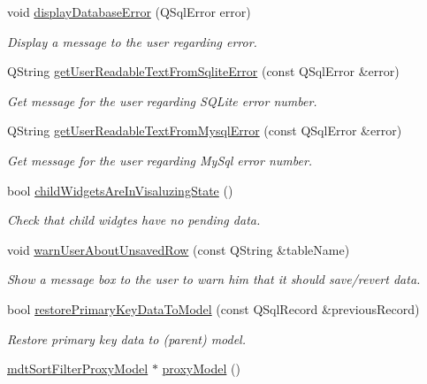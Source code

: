 \begin{DoxyCompactItemize}
void \hyperlink{classmdt_abstract_sql_widget_a3401020fed292da2c3b565a536f0be47}{display\-Database\-Error} (Q\-Sql\-Error error)
\begin{DoxyCompactList}\small\item\em Display a message to the user regarding error. \end{DoxyCompactList}\item 
Q\-String \hyperlink{classmdt_abstract_sql_widget_aeeddeec556cc20c5c9a49559df7898d9}{get\-User\-Readable\-Text\-From\-Sqlite\-Error} (const Q\-Sql\-Error \&error)
\begin{DoxyCompactList}\small\item\em Get message for the user regarding S\-Q\-Lite error number. \end{DoxyCompactList}\item 
Q\-String \hyperlink{classmdt_abstract_sql_widget_a1081ced9b96f60b3b39c6085bfe305d4}{get\-User\-Readable\-Text\-From\-Mysql\-Error} (const Q\-Sql\-Error \&error)
\begin{DoxyCompactList}\small\item\em Get message for the user regarding My\-Sql error number. \end{DoxyCompactList}\item 
bool \hyperlink{classmdt_abstract_sql_widget_aebd051866b148eb6f60a10c6ac648efa}{child\-Widgets\-Are\-In\-Visaluzing\-State} ()
\begin{DoxyCompactList}\small\item\em Check that child widgtes have no pending data. \end{DoxyCompactList}\item 
void \hyperlink{classmdt_abstract_sql_widget_ad20a178299c96790587b53380bb68282}{warn\-User\-About\-Unsaved\-Row} (const Q\-String \&table\-Name)
\begin{DoxyCompactList}\small\item\em Show a message box to the user to warn him that it should save/revert data. \end{DoxyCompactList}\item 
bool \hyperlink{classmdt_abstract_sql_widget_ac93226881ba03311a6a95ecd2ddaa003}{restore\-Primary\-Key\-Data\-To\-Model} (const Q\-Sql\-Record \&previous\-Record)
\begin{DoxyCompactList}\small\item\em Restore primary key data to (parent) model. \end{DoxyCompactList}\item 
\hyperlink{classmdt_sort_filter_proxy_model}{mdt\-Sort\-Filter\-Proxy\-Model} $\ast$ \hyperlink{classmdt_abstract_sql_widget_ab522e27f86e2bab42616cac581f31ac5}{proxy\-Model} ()

\end{DoxyCompactItemize}
